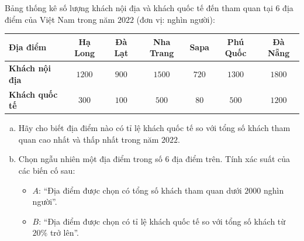 \begin{bt}%
Bảng thống kê số lượng khách nội địa và khách quốc tế đến tham quan tại $6$ địa điểm của Việt Nam trong năm $2022$ (đơn vị: nghìn người):
\begin{center}
	\begin{tabular}{|l|c|c|c|c|c|c|}
		\hline
		\textbf{Địa điểm} & \textbf{Hạ Long} & \textbf{Đà Lạt} & \textbf{Nha Trang} & \textbf{Sapa} & \textbf{Phú Quốc} & \textbf{Đà Nẵng} \\ \hline
		\textbf{Khách nội địa} & $1200$ & $900$ & $1500$ & $720$ & $1300$ & $1800$ \\ \hline
		\textbf{Khách quốc tế} & $300$ & $100$ & $500$ & $80$ & $500$ & $1200$ \\ \hline
	\end{tabular}
\end{center}
\begin{enumerate}[a)]
	\item Hãy cho biết địa điểm nào có tỉ lệ khách quốc tế so với tổng số khách tham quan cao nhất và thấp nhất trong năm $2022$.
	\item Chọn ngẫu nhiên một địa điểm trong số $6$ địa điểm trên. Tính xác suất của các biến cố sau:
	\begin{itemize}
		\item $A$: ``Địa điểm được chọn có tổng số khách tham quan dưới $2000$ nghìn người''.
		\item $B$: ``Địa điểm được chọn có tỉ lệ khách quốc tế so với tổng số khách từ $20\%$ trở lên''.
	\end{itemize}
\end{enumerate}
\end{bt}
